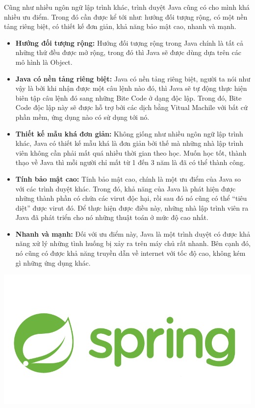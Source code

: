 
Cũng như nhiều ngôn ngữ lập trình khác, trình duyệt Java cũng có cho mình khá nhiều ưu điểm. Trong đó cần được kể tới như: hướng đối tượng rộng, có một nền tảng riêng biệt, có thiết kế đơn giản, khả năng bảo mật cao, nhanh và mạnh.
\begin{itemize}
    \item \textbf{Hướng đối tượng rộng:} Hướng đối tượng rộng trong Java chính là tất cả những thứ đều được mở rộng, trong đó thì Java sẽ được dùng dựa trên các mô hình là Object.
    \item \textbf{Java có nền tảng riêng biệt:} Java có nền tảng riêng biệt, người ta nói như vậy là bởi khi nhận được một câu lệnh nào đó, thì Java sẽ tự động thực hiện biên tập câu lệnh đó sang những Bite Code ở dạng độc lập. Trong đó, Bite Code độc lập này sẽ được hỗ trợ bởi các dịch bằng Vitual Machile với bất cứ phần mềm, ứng dụng nào có sử dụng tới nó.
    \item \textbf{Thiết kế mẫu khá đơn giản:} Không giống như nhiều ngôn ngữ lập trình khác, Java có thiết kế mẫu khá là đơn giản bởi thế mà những nhà lập trình viên không cần phải mất quá nhiều thời gian theo học. Muốn học tốt, thành thạo về Java thì mỗi người chỉ mất từ 1 đến 3 năm là đã có thể thành công.
    \item \textbf{Tính bảo mật cao:} Tính bảo mật cao, chính là một ưu điểm của Java so với các trình duyệt khác. Trong đó, khả năng của Java là phát hiện được những thành phần có chứa các virut độc hại, rồi sau đó nó cũng có thể “tiêu diệt” được  virut đó. Để thực hiện được điều này, những nhà lập trình viên ra Java đã phát triển cho nó những thuật toán ở mức độ cao nhất.
    \item \textbf{Nhanh và mạnh:} Đối với ưu điểm này, Java là một trình duyệt có được khả năng xử lý những tình huống bị xảy ra trên máy chủ rất nhanh. Bên cạnh đó, nó cũng có được khả năng truyền dẫn về internet với tốc độ cao, không kém gì những ứng dụng khác.
\end{itemize}

\begin{center}
  \captionsetup{type=figure}
  \includegraphics[width=15cm]{img/spring.png}
\end{center}

